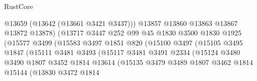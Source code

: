\begin{lexlean}{RustCore}
\begin{coremodule}
                                      @13659
                                      (@13642 (@13661 @3421 @3437)))
                                    @13857
                                    @13860
                                    @13863
                                    @13867
                                    @13872
                                    @13878)
                                  (@13717
                                    @3447
                                    @252
                                    @99
                                    @45
                                    @1830
                                    @3500
                                    @1830
                                    @1925
                                    (@15577
                                      @3499
                                      (@15583
                                        @3497
                                        @1851
                                        @820
                                        (@15100
                                          @3497
                                          (@15105
                                            @3495
                                            @1847
                                            (@15111
                                              @3481
                                              @3493
                                              (@15117
                                                @3481
                                                @3491
                                                @2334
                                                (@15124
                                                  @3480
                                                  @3490
                                                  @1807
                                                  @3452
                                                  @1814
                                                  @13614
                                                  (@15135
                                                    @3479
                                                    @3489
                                                    @1807
                                                    @3462
                                                    @1814
                                                    @15144
                                                    (@13830
                                                      @3472
                                                      @1814

\end{coremodule}
\end{lexlean}
